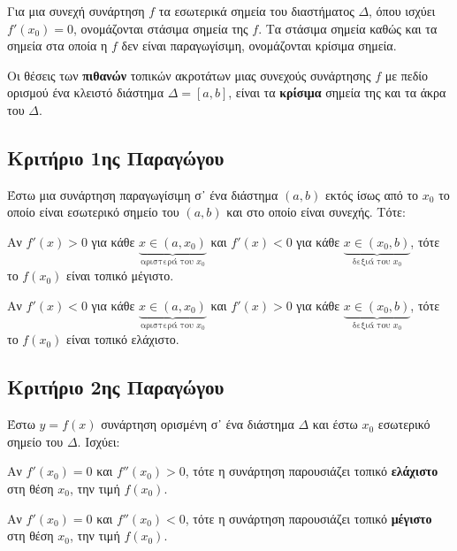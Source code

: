 \begin{dfn}
  Για μια συνεχή συνάρτηση $f$ τα εσωτερικά σημεία του διαστήματος $\Delta$, όπου 
  ισχύει $ f'(x_{0}) = 0 $, ονομάζονται \textcolor{Col1}{στάσιμα} σημεία της $f$. 
  Τα στάσιμα σημεία καθώς και τα σημεία στα οποία η $f$ δεν είναι παραγωγίσιμη,
  ονομάζονται \textcolor{Col1}{κρίσιμα} σημεία.
\end{dfn}

\begin{rem}
  Οι θέσεις των \textbf{πιθανών} τοπικών ακροτάτων μιας συνεχούς συνάρτησης $f$ με πεδίο 
  ορισμού ένα κλειστό διάστημα $ \Delta = [a,b] $, είναι τα \textbf{κρίσιμα} σημεία 
  της και τα άκρα του $\Delta$.
\end{rem}


\subsection*{Κριτήριο 1ης Παραγώγου}
Έστω μια συνάρτηση παραγωγίσιμη σ᾽ ένα διάστημα $ (a,b) $ εκτός ίσως από το $ x_{0} $ 
το οποίο είναι εσωτερικό σημείο του $(a,b)$ και στο οποίο είναι συνεχής. Τότε:
\begin{myitemize}
  \item Αν $ f'(x)>0 $ για κάθε 
    $ \underbrace{x \in (a, x_{0})}_{\text{αριστερά του } x_{0}} $ 
    και $ f'(x) <0 $ για κάθε
    $ \underbrace{x \in (x_{0}, b)}_{\text{δεξιά του } x_{0}} $, τότε το $ f(x_{0}) $ 
    είναι τοπικό μέγιστο. 
  \item Αν $ f'(x)<0 $ για κάθε 
    $ \underbrace{x \in (a, x_{0})}_{\text{αριστερά του } x_{0}} $ 
    και $ f'(x) >0 $ για κάθε
    $ \underbrace{x \in (x_{0}, b)}_{\text{δεξιά του } x_{0}} $, τότε το $ f(x_{0}) $ 
    είναι τοπικό ελάχιστο. 
\end{myitemize}



\subsection*{Κριτήριο 2ης Παραγώγου}

\begin{prop}
  Έστω $ y=f(x) $ συνάρτηση ορισμένη σ᾽ ένα διάστημα $\Delta$ και έστω $ x_{0} $ 
  εσωτερικό σημείο του $\Delta$. Ισχύει:
  \begin{myitemize}
    \item Αν $ f'(x_{0})=0 $ και $ f''(x_{0}) > 0 $, τότε η συνάρτηση παρουσιάζει τοπικό 
      \textbf{ελάχιστο} στη θέση $ x_{0} $, την τιμή $ f(x_{0}) $.
    \item Αν $ f'(x_{0})=0 $ και $ f''(x_{0}) < 0 $, τότε η συνάρτηση παρουσιάζει τοπικό 
      \textbf{μέγιστο} στη θέση $ x_{0} $, την τιμή $ f(x_{0}) $.
  \end{myitemize}
\end{prop}


